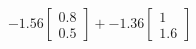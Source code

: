 \documentclass[preview]{standalone}
\begin{document}
\begin{align*}
-1.56 \begin{bmatrix} 0.8 \\ 0.5 \end{bmatrix} + -1.36 \begin{bmatrix} 1 \\ 1.6 \end{bmatrix}
\end{align*}
\end{document}
